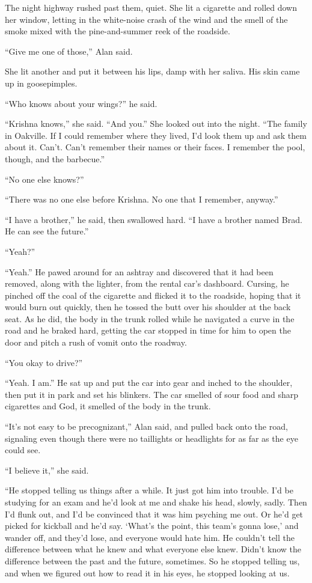 The night highway rushed past them, quiet.  She lit a cigarette and
rolled down her window, letting in the white-noise crash of the wind
and the smell of the smoke mixed with the pine-and-summer reek of the
roadside.

``Give me one of those,'' Alan said.

She lit another and put it between his lips, damp with her saliva. 
His skin came up in goosepimples.

``Who knows about your wings?'' he said.

``Krishna knows,'' she said.  ``And you.'' She looked out into the
night.  ``The family in Oakville.  If I could remember where they
lived, I'd look them up and ask them about it.  Can't.  Can't remember
their names or their faces.  I remember the pool, though, and the
barbecue.''

``No one else knows?''

``There was no one else before Krishna.  No one that I remember,
anyway.''

``I have a brother,'' he said, then swallowed hard.  ``I have a
brother named Brad.  He can see the future.''

``Yeah?''

``Yeah.'' He pawed around for an ashtray and discovered that it had
been removed, along with the lighter, from the rental car's dashboard. 
Cursing, he pinched off the coal of the cigarette and flicked it to
the roadside, hoping that it would burn out quickly, then he tossed
the butt over his shoulder at the back seat.  As he did, the body in
the trunk rolled while he navigated a curve in the road and he braked
hard, getting the car stopped in time for him to open the door and
pitch a rush of vomit onto the roadway.

``You okay to drive?''

``Yeah.  I am.'' He sat up and put the car into gear and inched to the
shoulder, then put it in park and set his blinkers.  The car smelled
of sour food and sharp cigarettes and God, it smelled of the body in
the trunk.

``It's not easy to be precognizant,'' Alan said, and pulled back onto
the road, signaling even though there were no taillights or headlights
for as far as the eye could see.

``I believe it,'' she said.

``He stopped telling us things after a while.  It just got him into
trouble.  I'd be studying for an exam and he'd look at me and shake
his head, slowly, sadly.  Then I'd flunk out, and I'd be convinced
that it was him psyching me out.  Or he'd get picked for kickball and
he'd say.  `What's the point, this team's gonna lose,' and wander off,
and they'd lose, and everyone would hate him.  He couldn't tell the
difference between what he knew and what everyone else knew.  Didn't
know the difference between the past and the future, sometimes.  So he
stopped telling us, and when we figured out how to read it in his
eyes, he stopped looking at us.

